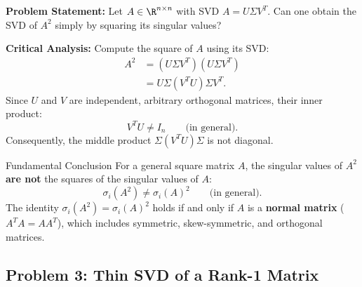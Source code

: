 \begin{example}
\textbf{Problem Statement:} Let $A \in \R^{n \times n}$ with SVD $A = U \Sigma V^T$. Can one obtain the SVD of $A^2$ simply by squaring its singular values?

\medskip
\textbf{Critical Analysis:}
Compute the square of $A$ using its SVD:
\begin{align}
    A^2 &= (U \Sigma V^T)(U \Sigma V^T) \nonumber \\
        &= U \Sigma (V^T U) \Sigma V^T.
\end{align}
Since $U$ and $V$ are independent, arbitrary orthogonal matrices, their inner product:
\begin{equation}
    V^T U \neq I_n \qquad \text{(in general)}.
\end{equation}
Consequently, the middle product $\Sigma (V^T U) \Sigma$ is not diagonal.

\begin{alertblock}{Fundamental Conclusion}
For a general square matrix $A$, the singular values of $A^2$ \textbf{are not} the squares of the singular values of $A$:
\begin{equation}
    \sigma_i(A^2) \neq \sigma_i(A)^2 \qquad \text{(in general)}.
\end{equation}
The identity $\sigma_i(A^2) = \sigma_i(A)^2$ holds if and only if $A$ is a \textbf{normal matrix} ($A^T A = A A^T$), which includes symmetric, skew-symmetric, and orthogonal matrices.
\end{alertblock}
\end{example}

\subsection{Problem 3: Thin SVD of a Rank-1 Matrix}

